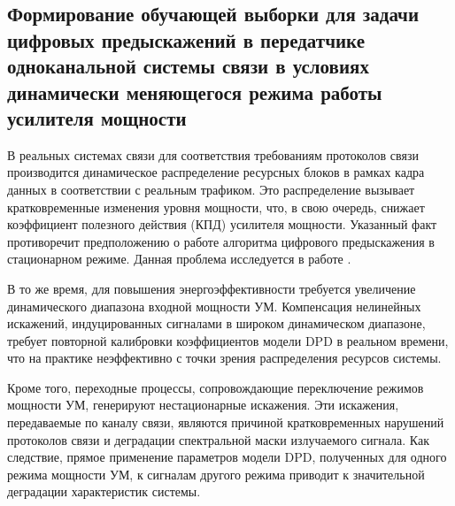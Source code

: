 \subsection{Формирование обучающей выборки для задачи цифровых предыскажений в передатчике одноканальной системы связи в условиях динамически меняющегося режима работы усилителя мощности} \label{subsec:data_dpd_dynamic}

В реальных системах связи для соответствия требованиям протоколов связи~\cite{3gpp_36_804} производится динамическое распределение ресурсных блоков в рамках кадра данных в соответствии с реальным трафиком. Это распределение вызывает кратковременные изменения уровня мощности, что, в свою очередь, снижает коэффициент полезного действия (КПД) усилителя мощности. Указанный факт противоречит предположению о работе алгоритма цифрового предыскажения в стационарном режиме. Данная проблема исследуется в работе \cite{Dynamic_DPD_RB_Alloc}.

В то же время, для повышения энергоэффективности требуется увеличение динамического диапазона входной мощности УМ. Компенсация нелинейных искажений, индуцированных сигналами в широком динамическом диапазоне, требует повторной калибровки коэффициентов модели DPD в реальном времени, что на практике неэффективно с точки зрения распределения ресурсов системы.

Кроме того, переходные процессы, сопровождающие переключение режимов мощности УМ, генерируют нестационарные искажения. Эти искажения, передаваемые по каналу связи, являются причиной кратковременных нарушений протоколов связи и деградации спектральной маски излучаемого сигнала. Как следствие, прямое применение параметров модели DPD, полученных для одного режима мощности УМ, к сигналам другого режима приводит к значительной деградации характеристик системы.

